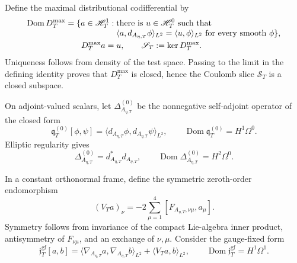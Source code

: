 Define the maximal distributional codifferential by
\begin{align}
 \operatorname{Dom}D_T^{\max}
 =\{a\in\mathscr H_T^1:\;&\text{there is }u\in\mathscr H_T^0\text{ such that}
 \notag\\[-1mm]
 &\langle a,d_{A_{\eta,T}}\phi\rangle_{L^2}
 =\langle u,\phi\rangle_{L^2}
 \text{ for every smooth }\phi\},
 \label{cusp-native-full-flux-max-codiff-domain}\\
 D_T^{\max}a={}&u,
 \qquad \mathscr S_T:=\ker D_T^{\max}.
 \label{cusp-native-full-flux-Coulomb-slice}
\end{align}
Uniqueness follows from density of the test space.  Passing to the limit in
the defining identity proves that \(D_T^{\max}\) is closed, hence the Coulomb
slice \(\mathscr S_T\) is a closed subspace.

On adjoint-valued scalars, let \(\Delta_{A_{\eta,T}}^{(0)}\) be the
nonnegative self-adjoint operator of the closed form
\begin{equation}
 \mathfrak q_T^{(0)}[\phi,\psi]
 =\langle d_{A_{\eta,T}}\phi,d_{A_{\eta,T}}\psi\rangle_{L^2},
 \qquad
 \operatorname{Dom}\mathfrak q_T^{(0)}=H^1\Omega^0.
 \label{cusp-native-full-flux-scalar-form}
\end{equation}
Elliptic regularity gives
\begin{equation}
 \Delta_{A_{\eta,T}}^{(0)}=d_{A_{\eta,T}}^*d_{A_{\eta,T}},
 \qquad
 \operatorname{Dom}\Delta_{A_{\eta,T}}^{(0)}=H^2\Omega^0.
 \label{cusp-native-full-flux-scalar-domain}
\end{equation}

In a constant orthonormal frame, define the symmetric zeroth-order
endomorphism
\begin{equation}
 (V_Ta)_\nu=-2\sum_{\mu=1}^4
 [F_{A_{\eta,T},\nu\mu},a_\mu].
 \label{cusp-native-full-flux-spin-endomorphism}
\end{equation}
Symmetry follows from invariance of the compact Lie-algebra inner product,
antisymmetry of \(F_{\nu\mu}\), and an exchange of \(\nu,\mu\).  Consider
the gauge-fixed form
\begin{equation}
 \mathfrak j_T^{\mathrm{gf}}[a,b]
 =\langle\nabla_{A_{\eta,T}}a,\nabla_{A_{\eta,T}}b\rangle_{L^2}
  +\langle V_Ta,b\rangle_{L^2},
 \qquad
 \operatorname{Dom}\mathfrak j_T^{\mathrm{gf}}=H^1\Omega^1.
 \label{cusp-native-full-flux-Jacobi-form}
\end{equation}

